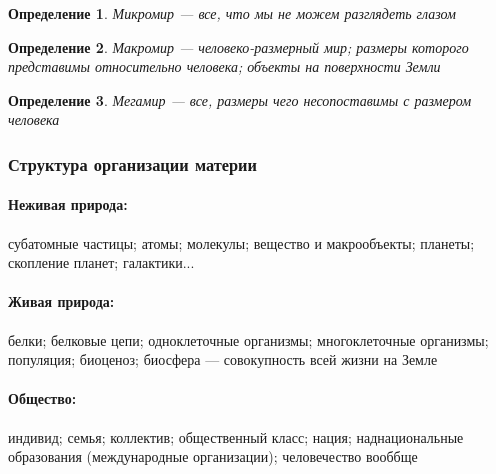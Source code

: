 \documentclass{article}
\newtheorem{definition}{Определение}
\begin{document}
\begin{flushleft}
\begin{definition}
    Микромир — все, что мы не можем разглядеть глазом
\end{definition}

\begin{definition}
    Макромир — человеко-размерный мир; размеры которого представимы относительно человека; объекты на поверхности Земли
\end{definition}

\begin{definition}
    Мегамир — все, размеры чего несопоставимы с размером человека
\end{definition}

\subsubsection{Структура организации материи}

\paragraph{Неживая природа:} субатомные частицы; атомы; молекулы; вещество и макрообъекты; планеты; скопление планет; галактики...

\paragraph{Живая природа:} белки; белковые цепи; одноклеточные организмы; многоклеточные организмы; популяция; биоценоз; биосфера — совокупность всей жизни на Земле

\paragraph{Общество:} индивид; семья; коллектив; общественный класс; нация; наднациональные образования (международные организации); человечество вооббще

\end{flushleft}
\end{document}
